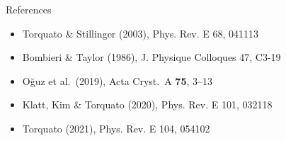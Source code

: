 \documentclass[aspectratio=169, 11pt]{beamer}
\begin{document}
\begin{frame}{References}

\small
\begin{itemize}
    \item Torquato \& Stillinger (2003), Phys. Rev. E 68, 041113
    \item Bombieri \& Taylor (1986), J. Physique Colloques 47, C3-19
    \item O\u{g}uz et al.\ (2019), Acta Cryst.\ A \textbf{75}, 3--13
    \item Klatt, Kim \& Torquato (2020), Phys. Rev. E 101, 032118
    \item Torquato (2021), Phys. Rev. E 104, 054102
\end{itemize}
\end{frame}
\note{

}
\end{document}
